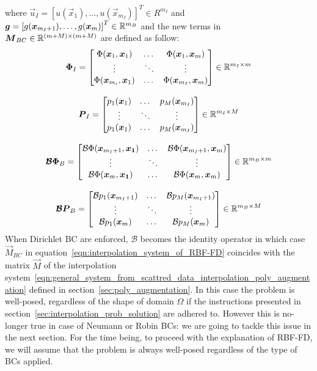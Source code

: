 where $\vec{u}_I = \left[ u(\vec{x}_1), \dots, u(\vec{x}_{m_I}) \right]^T \in R^{m_I}$ and $\boldsymbol{g} = \left[g(\boldsymbol{x}_{m_I+1}), \dots, g(\boldsymbol{x}_m)\right]^T \in \mathbb{R}^{m_B}$ and the new terms in $\boldsymbol{M}_{BC} \in \mathbb{R}^{(m+M) \times (m+M)}$ are defined as follow:
\begin{equation}
	\begin{gathered}
		\boldsymbol{\Phi}_I = \begin{bmatrix}
							\Phi(\boldsymbol{x}_1, \boldsymbol{x}_1)    	  &    \dots    & \Phi(\boldsymbol{x}_1, \boldsymbol{x}_m)  		\\
							\vdots						  	  &  \ddots		& \vdots					  		\\
							\Phi(\boldsymbol{x}_{m_i}, \boldsymbol{x}_1)    &    \dots    & \Phi(\boldsymbol{x}_{m_I}, \boldsymbol{x}_m)
					   \end{bmatrix} \in \mathbb{R}^{m_I \times m}  \\[2ex]
		\boldsymbol{P}_I = \begin{bmatrix}
							p_1(\boldsymbol{x}_{1})	&  \dots  &  p_M(\boldsymbol{x}_{m_I})   \\
							\vdots				& \ddots  & \vdots					\\	
							p_1(\boldsymbol{x}_{1})	&  \dots  &  p_M(\boldsymbol{x}_{m_I})
					\end{bmatrix} \in \mathbb{R}^{m_I \times M}  \\[2ex]
		\boldsymbol{\mathcal{B}\Phi}_B = \begin{bmatrix}
										\mathcal{B}\Phi(\boldsymbol{x}_{m_I+1}, \boldsymbol{x_1})  &  \dots  & \mathcal{B}\Phi(\boldsymbol{x}_{m_I+1}, \boldsymbol{x}_m)  \\
										\vdots										 & \ddots  & \vdots										  \\
										\mathcal{B}\Phi(\boldsymbol{x}_{m}, \boldsymbol{x_1})  	 &  \dots  & \mathcal{B}\Phi(\boldsymbol{x}_{m}, \boldsymbol{x}_m)
								  \end{bmatrix} \in \mathbb{R}^{m_B \times m}  \\[2ex]
		\boldsymbol{\mathcal{B}P}_B = \begin{bmatrix}
									\mathcal{B}p_1(\boldsymbol{x}_{m_I+1})  &  \dots  & \mathcal{B}p_M(\boldsymbol{x}_{m_I+1})  \\
									\vdots							 & \ddots  & \vdots							  \\
									\mathcal{B}p_1(\boldsymbol{x}_{m})  	 &  \dots  & \mathcal{B}p_M(\boldsymbol{x}_{m})
							  \end{bmatrix} \in \mathbb{R}^{m_B \times M}
	\end{gathered}
\end{equation}
When Dirichlet BC are enforced, $\mathcal{B}$ becomes the identity operator in which case $\vec{M}_{BC}$ in equation~\eqref{eqn:interpolation_system_of_RBF-FD} coincides with the matrix $\vec{M}$ of the interpolation system~\eqref{eqn:general_system_from_scattred_data_interpolation_poly_augmentation} defined in section~\ref{sec:poly_augmentation}. In this case the problem is well-posed, regardless of the shape of domain $\Omega$ if the instructions presented in section~\ref{sec:interpolation_prob_solution} are adhered to. However this is no-longer true in case of Neumann or Robin BCs: we are going to tackle this issue in the next section. For the time being, to proceed with the explanation of RBF-FD, we will assume that the problem is always well-posed regardless of the type of BCs applied.


